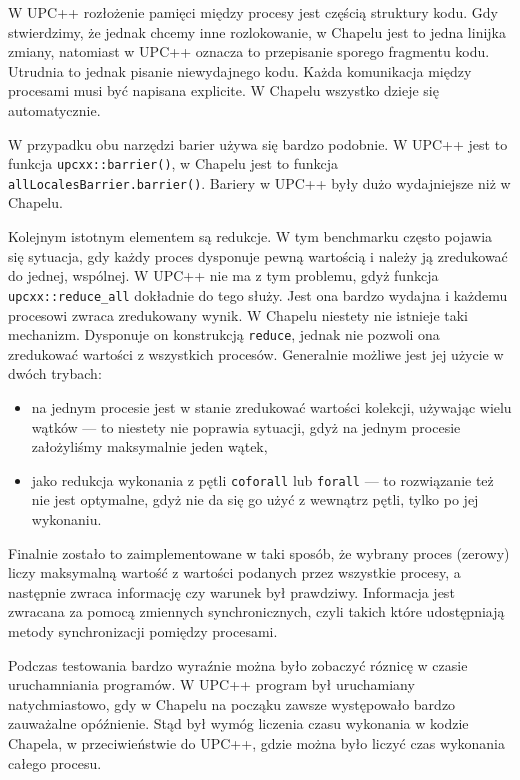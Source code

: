 W UPC++ rozłożenie pamięci między procesy jest częścią struktury kodu.
Gdy stwierdzimy, że jednak chcemy inne rozlokowanie, w Chapelu jest to
jedna linijka zmiany, natomiast w UPC++ oznacza to przepisanie sporego
fragmentu kodu.
Utrudnia to jednak pisanie niewydajnego kodu.
Każda komunikacja między procesami musi być napisana explicite.
W Chapelu wszystko dzieje się automatycznie.

W przypadku obu narzędzi barier używa się bardzo podobnie.
W UPC++ jest to funkcja \texttt{upcxx::barrier()},
w Chapelu jest to funkcja \texttt{allLocalesBarrier.barrier()}.
Bariery w UPC++ były dużo wydajniejsze niż w Chapelu.

Kolejnym istotnym elementem są redukcje.
W tym benchmarku często pojawia się sytuacja, gdy każdy proces
dysponuje pewną wartością i należy ją zredukować do jednej, wspólnej.
W UPC++ nie ma z tym problemu, gdyż funkcja \texttt{upcxx::reduce\_all}
dokładnie do tego służy.
Jest ona bardzo wydajna i każdemu procesowi zwraca zredukowany wynik.
W Chapelu niestety nie istnieje taki mechanizm.
Dysponuje on konstrukcją \texttt{reduce}, jednak nie pozwoli ona zredukować
wartości z wszystkich procesów.
Generalnie możliwe jest jej użycie w dwóch trybach:
\begin{itemize}
    \item na jednym procesie jest w stanie zredukować wartości
    kolekcji, używając wielu wątków --- to niestety nie poprawia sytuacji,
    gdyż na jednym procesie założyliśmy maksymalnie jeden wątek,
    \item jako redukcja wykonania z pętli \texttt{coforall}
    lub \texttt{forall} --- to rozwiązanie też nie jest optymalne, gdyż nie
    da się go użyć z wewnątrz pętli, tylko po jej wykonaniu.
\end{itemize}
Finalnie zostało to zaimplementowane w taki sposób, że
wybrany proces (zerowy) liczy maksymalną wartość z wartości podanych
przez wszystkie procesy, a następnie zwraca informację czy warunek był
prawdziwy.
Informacja jest zwracana za pomocą zmiennych synchronicznych,
czyli takich które udostępniają metody synchronizacji pomiędzy procesami.

Podczas testowania bardzo wyraźnie można było zobaczyć róznicę
w czasie uruchamniania programów.
W UPC++ program był uruchamiany natychmiastowo, gdy
w Chapelu na począku zawsze występowało bardzo zauważalne opóźnienie.
Stąd był wymóg liczenia czasu wykonania w kodzie Chapela,
w przeciwieństwie do UPC++, gdzie można było liczyć czas wykonania
całego procesu.


